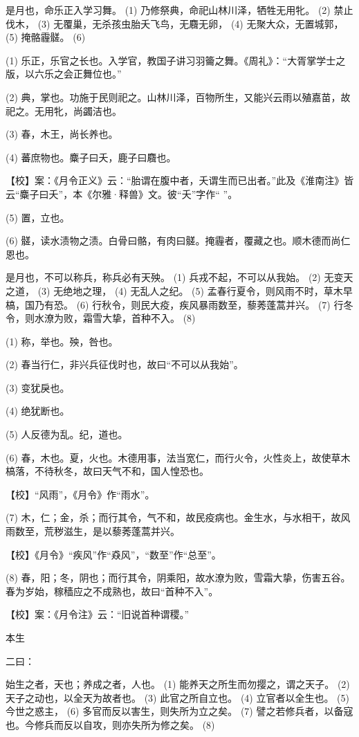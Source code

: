 \documentclass[12pt,UTF8]{ctexbook}
\begin{document}
是月也，命乐正入学习舞。 (1) 乃修祭典，命祀山林川泽，牺牲无用牝。 (2) 禁止伐木， (3) 无覆巢，无杀孩虫胎夭飞鸟，无麛无卵， (4) 无聚大众，无置城郭， (5) 掩骼霾髊。 (6)

(1) 乐正，乐官之长也。入学官，教国子讲习羽籥之舞。《周礼》：“大胥掌学士之版，以六乐之会正舞位也。”

(2) 典，掌也。功施于民则祀之。山林川泽，百物所生，又能兴云雨以殖嘉苗，故祀之。无用牝，尚蠲洁也。

(3) 春，木王，尚长养也。

(4) 蕃庶物也。麋子曰夭，鹿子曰麛也。

【校】案：《月令正义》云：“胎谓在腹中者，夭谓生而已出者。”此及《淮南注》皆云“麋子曰夭”，本《尔雅·释兽》文。彼“夭”字作“ ”。

(5) 置，立也。

(6) 髊，读水渍物之渍。白骨曰骼，有肉曰髊。掩霾者，覆藏之也。顺木德而尚仁恩也。

是月也，不可以称兵，称兵必有天殃。 (1) 兵戎不起，不可以从我始。 (2) 无变天之道， (3) 无绝地之理， (4) 无乱人之纪。 (5) 孟春行夏令，则风雨不时，草木早槁，国乃有恐。 (6) 行秋令，则民大疫，疾风暴雨数至，藜莠蓬蒿并兴。 (7) 行冬令，则水潦为败，霜雪大挚，首种不入。 (8)

(1) 称，举也。殃，咎也。

(2) 春当行仁，非兴兵征伐时也，故曰“不可以从我始”。

(3) 变犹戾也。

(4) 绝犹断也。

(5) 人反德为乱。纪，道也。

(6) 春，木也。夏，火也。木德用事，法当宽仁，而行火令，火性炎上，故使草木槁落，不待秋冬，故曰天气不和，国人惶恐也。

【校】“风雨”，《月令》作“雨水”。

(7) 木，仁；金，杀；而行其令，气不和，故民疫病也。金生水，与水相干，故风雨数至，荒秽滋生，是以藜莠蓬蒿并兴。

【校】《月令》“疾风”作“猋风”，“数至”作“总至”。

(8) 春，阳；冬，阴也；而行其令，阴乘阳，故水潦为败，雪霜大挚，伤害五谷。春为岁始，稼穑应之不成熟也，故曰“首种不入”。

【校】案：《月令注》云：“旧说首种谓稷。”





本生


二曰：

始生之者，天也；养成之者，人也。 (1) 能养天之所生而勿撄之，谓之天子。 (2) 天子之动也，以全天为故者也。 (3) 此官之所自立也。 (4) 立官者以全生也。 (5) 今世之惑主， (6) 多官而反以害生，则失所为立之矣。 (7) 譬之若修兵者，以备寇也。今修兵而反以自攻，则亦失所为修之矣。 (8)
\end{document}
